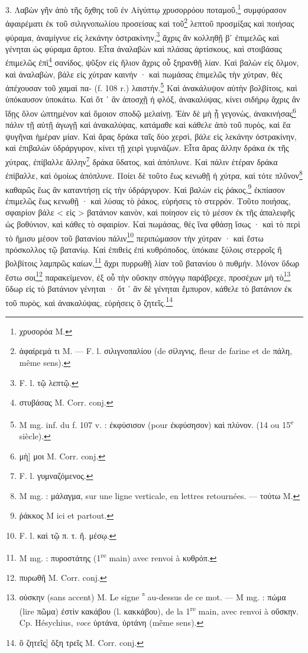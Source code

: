 \documentclass[a4paper, 11pt, oneside, polutonikogreek, french]{article}
\begin{document}
3. Λαβὼν γῆν ἀπὸ τῆς ὄχθης τοῦ ἐν Αἰγύπτῳ χρυσορρόου ποταμοῦ,\footnote{χρυσορόα M.} συμφύρασον ἀφαιρέματι ἐκ τοῦ σιλιγνοπωλίου προσείσας καὶ τοῦ\footnote{ἀφαίρεμά τι M. --- F. l. σιλιγνοπαλίου (de σίλιγνις, fleur de farine et de πάλη, même sens).} λεπτοῦ προσμίξας καὶ ποιήσας φύραμα, ἀναμίγνυε εἰς λεκάνην ὀστρακίνην,\footnote{F. l. τῷ λεπτῷ.} ἄχρις ἂν κολληθῇ βʹ ἐπιμελῶς καὶ γένηται ὡς φύραμα ἄρτου. Εἶτα ἀναλαβὼν καὶ πλάσας ἀρτίσκους, καὶ στοιβάσας ἐπιμελῶς ἐπὶ\footnote{στυβάσας M. Corr. conj.} σανίδος, ψῦξον εἰς ἥλιον ἄχρις οὗ ξηρανθῇ λίαν. Καὶ βαλὼν εἰς ὅλμον, καὶ ἀναλαβὼν, βάλε εἰς χύτραν καινήν · καὶ πωμάσας ἐπιμελῶς τὴν χύτραν, θὲς ἀπέχουσαν τοῦ χαμαὶ πα- (f. 108 r.) λαιστήν.\footnote{M mg. inf. du f. 107 v. : ἐκφύσισον (pour ἐκφύσησον) καὶ πλύνον. (14 ou 15\textsuperscript{e} siècle).} Καὶ ἀνακάλυψον αὐτὴν βολβίτοις, καὶ ὑπόκαυσον ὑποκάτω. Καὶ ὅτ ᾽ ἂν ἀποσχῇ ἡ φλόξ, ἀνακαλύψας, κίνει σιδήρῳ ἄχρις ἂν ἴδῃς ὅλον ὠπτημένον καὶ ὅμοιον σποδῷ μελαίνῃ. Ἐὰν δὲ μὴ ᾖ γεγονὼς, ἀνακινήσας\footnote{μὴ] μοι M. Corr. conj.} πάλιν τῇ αὐτῇ ἀγωγῇ καὶ ἀνακαλύψας, κατάμαθε καὶ κάθελε ἀπὸ τοῦ πυρὸς, καὶ ἔα ψυγῆναι ἡμέραν μίαν. Καὶ ἄρας δράκα ταῖς δύο χερσὶ, βάλε εἰς λεκάνην ὀστρακίνην, καὶ ἐπιβαλὼν ὑδράργυρον, κίνει τῇ χειρὶ γυμνάζων. Εἶτα ἄρας ἄλλην δράκα ἐκ τῆς χύτρας, ἐπίβαλλε ἄλλην\footnote{F. l. γυμναζόμενος.} δράκα ὕδατος, καὶ ἀπόπλυνε. Καὶ πάλιν ἑτέραν δράκα ἐπίβαλλε, καὶ ὁμοίως ἀπόπλυνε. Ποίει δὲ τοῦτο ἕως κενωθῇ ἡ χύτρα, καὶ τότε πλῦνον\footnote{M mg. : μάλαγμα, sur une ligne verticale, en lettres retournées. --- τούτω M.} καθαρῶς ἕως ἂν καταντήσῃ εἰς τὴν ὑδράργυρον. Καὶ βαλὼν εἰς ῥάκος,\footnote{ῥάκκος M ici et partout.} ἐκπίασον ἐπιμελῶς ἕως κενωθῇ · καὶ λύσας τὸ ῥάκος, εὑρήσεις τὸ στερρόν. Τοῦτο ποιήσας, σφαιρίον βάλε < εἰς > βατάνιον καινὸν, καὶ ποίησον εἰς τὸ μέσον ἐκ τῆς ἀπαλειφῆς ὡς βοθύνιον, καὶ κάθες τὸ σφαιρίον. Καὶ πωμάσας, θὲς ἵνα φθάσῃ ἴσως · καὶ τὸ περὶ τὸ ἥμισυ μέσον τοῦ βατανίου πάλιν\footnote{F. l. καὶ τῷ π. τ. ἥ. μέσῳ.} περιπώμασον τὴν χύτραν · καὶ ἔστω πρόσκολλος τῷ βατανίῳ. Καὶ ἐπιθεὶς ἐπὶ κυθρόποδος, ὑπόκαιε ξύλοις στερροῖς ἢ βολβίτοις λαμπρῶς καίων,\footnote{M mg. : πυροστάτης (1\textsuperscript{re} main) avec renvoi à κυθρόπ.} ἄχρι πυρρωθῇ λίαν τοῦ βατανίου ὁ πυθμήν. Μόνον ὕδωρ ἔστω σοι\footnote{πυρωθῆ M. Corr. conj.} παρακείμενον, ἐξ οὗ τὴν οὕσκην σπόγγῳ παράβρεχε, προσέχων μὴ τὸ\footnote{οὐσκην (sans accent) M. Le signe ῁ au-dessus de ce mot. --- M mg. : πώμα (lire πῶμα) ἐστὶν κακάβου (l. κακκάβου), de la 1\textsuperscript{re} main, avec renvoi à οὔσκην. Cp. Hésychius, \emph{voce} ὑρτάνα, ὑρτάνη (même sens).} ὕδωρ εἰς τὸ βατάνιον γένηται · ὅτ ᾽ ἂν δὲ γένηται ἔμπυρον, κάθελε τὸ βατάνιον ἐκ τοῦ πυρὸς, καὶ ἀνακαλύψας, εὑρήσεις ὃ ζητεῖς.\footnote{ὃ ζητεῖς] ὄξη τρεῖς M. Corr. conj.}
\end{document}

